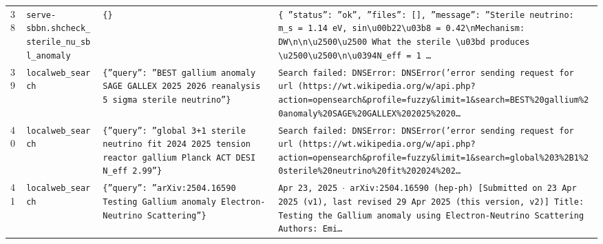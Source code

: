 \documentclass[11pt,a4paper]{article}
\begin{document}
\begin{longtable}{@{}p{}p{}p{}p{}@{}}
38 & \texttt{serve-sbbn.sh}\newline\texttt{check\_\allowbreak{}sterile\_\allowbreak{}nu\_\allowbreak{}sbl\_\allowbreak{}anomaly} & \texttt{\{\}\allowbreak{}} & \texttt{\{   ''status'':\allowbreak{} ''ok'',\allowbreak{}   ''files'':\allowbreak{} []\allowbreak{},\allowbreak{}   ''message'':\allowbreak{} ''Sterile neutrino:\allowbreak{} m\_\allowbreak{}s =\allowbreak{} 1.14 eV,\allowbreak{} sin\textbackslash{}\allowbreak{}u00b22\textbackslash{}\allowbreak{}u03b8 =\allowbreak{} 0.42\textbackslash{}\allowbreak{}nMechanism:\allowbreak{} DW\textbackslash{}\allowbreak{}n\textbackslash{}\allowbreak{}n\textbackslash{}\allowbreak{}u2500\textbackslash{}\allowbreak{}u2500 What the sterile \textbackslash{}\allowbreak{}u03bd produces \textbackslash{}\allowbreak{}u2500\textbackslash{}\allowbreak{}u2500\textbackslash{}\allowbreak{}n\textbackslash{}\allowbreak{}u0394N\_\allowbreak{}eff =\allowbreak{} 1 \ldots{}\allowbreak{}} \\
39 & \texttt{local}\newline\texttt{web\_\allowbreak{}search} & \texttt{\{''query'':\allowbreak{} ''BEST gallium anomaly SAGE GALLEX 2025 2026 reanalysis 5 sigma sterile neutrino''\}\allowbreak{}} & \texttt{Search failed:\allowbreak{} DNSError:\allowbreak{} DNSError('error sending request for url (https:\allowbreak{}/\allowbreak{}/\allowbreak{}wt.wikipedia.org/\allowbreak{}w/\allowbreak{}api.php?action=\allowbreak{}opensearch\&profile=\allowbreak{}fuzzy\&limit=\allowbreak{}1\&search=\allowbreak{}BEST\%20gallium\%20anomaly\%20SAGE\%20GALLEX\%202025\%2020\ldots{}\allowbreak{}} \\
40 & \texttt{local}\newline\texttt{web\_\allowbreak{}search} & \texttt{\{''query'':\allowbreak{} ''global 3+1 sterile neutrino fit 2024 2025 tension reactor gallium Planck ACT DESI N\_\allowbreak{}eff 2.99''\}\allowbreak{}} & \texttt{Search failed:\allowbreak{} DNSError:\allowbreak{} DNSError('error sending request for url (https:\allowbreak{}/\allowbreak{}/\allowbreak{}wt.wikipedia.org/\allowbreak{}w/\allowbreak{}api.php?action=\allowbreak{}opensearch\&profile=\allowbreak{}fuzzy\&limit=\allowbreak{}1\&search=\allowbreak{}global\%203\%2B1\%20sterile\%20neutrino\%20fit\%202024\%202\ldots{}\allowbreak{}} \\
41 & \texttt{local}\newline\texttt{web\_\allowbreak{}search} & \texttt{\{''query'':\allowbreak{} ''arXiv:\allowbreak{}2504.16590 Testing Gallium anomaly Electron-Neutrino Scattering''\}\allowbreak{}} & \texttt{Apr 23,\allowbreak{} 2025 $\cdot$ arXiv:\allowbreak{}2504.16590 (hep-ph)\allowbreak{} [Submitted on 23 Apr 2025 (v1)\allowbreak{},\allowbreak{} last revised 29 Apr 2025 (this version,\allowbreak{} v2)\allowbreak{}]\allowbreak{} Title:\allowbreak{} Testing the Gallium anomaly using Electron-Neutrino Scattering Authors:\allowbreak{} Emi\ldots{}\allowbreak{}} \\

\end{longtable}
\end{document}
